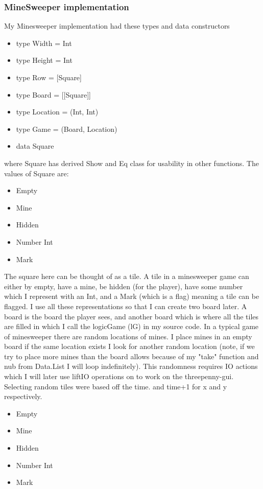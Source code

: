 \documentclass{article} %
\begin{document}
\subsubsection{MineSweeper implementation}
My Minesweeper implementation had these types and data constructors
\begin{itemize}
    \item type Width = Int
    \item type Height = Int
    \item type Row = [Square]
    \item type Board = [[Square]]
    \item type Location = (Int, Int)
    \item type Game = (Board, Location)
    \item data Square 
\end{itemize}
where Square has derived Show and Eq class for usability in other functions. The values of Square are: 
\begin{itemize}
    \item Empty
    \item Mine 
    \item Hidden
    \item Number Int
    \item Mark
\end{itemize}
The square here can be thought of as a tile. A tile in a minesweeper game can either by empty, have a mine, be hidden (for the player),
have some number which I represent with an Int, and a Mark (which is a flag) meaning a tile can be flagged. I use all these representations
so that I can create two board later. A board is the board the player sees, and another board which is where all the tiles are filled in
which I call the logicGame (lG) in my source code. In a typical game of minesweeper there are random locations of mines. I place mines
in an empty board if the same location exists I look for another random location (note, if we try to place more mines than the board allows
because of my "take" function and nub from Data.List I will loop indefinitely). This randomness requires IO actions which I will later use
liftIO operations on to work on the threepenny-gui. Selecting random tiles were based off the time. and time+1 for x and y respectively. 
\begin{itemize}
    \item Empty
    \item Mine 
    \item Hidden
    \item Number Int
    \item Mark
\end{itemize}
\end{document}
